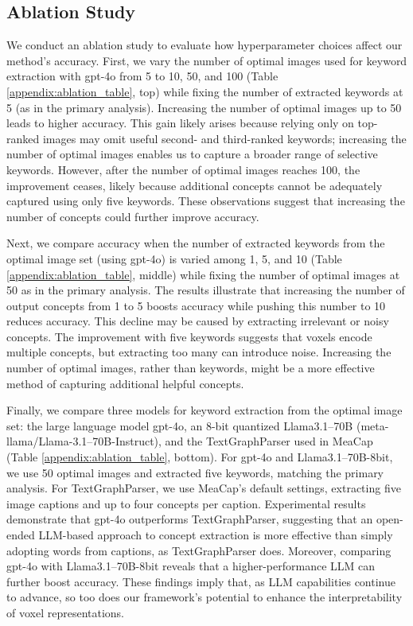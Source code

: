 \subsection{Ablation Study}
\label{appendix:ablation}
We conduct an ablation study to evaluate how hyperparameter choices affect our method’s accuracy. First, we vary the number of optimal images used for keyword extraction with gpt-4o from 5 to 10, 50, and 100 (Table \ref{appendix:ablation_table}, top) while fixing the number of extracted keywords at 5 (as in the primary analysis). Increasing the number of optimal images up to 50 leads to higher accuracy. This gain likely arises because relying only on top-ranked images may omit useful second- and third-ranked keywords; increasing the number of optimal images enables us to capture a broader range of selective keywords. However, after the number of optimal images reaches 100, the improvement ceases, likely because additional concepts cannot be adequately captured using only five keywords. These observations suggest that increasing the number of concepts could further improve accuracy.

Next, we compare accuracy when the number of extracted keywords from the optimal image set (using gpt-4o) is varied among 1, 5, and 10 (Table \ref{appendix:ablation_table}, middle) while fixing the number of optimal images at 50 as in the primary analysis. The results illustrate that increasing the number of output concepts from 1 to 5 boosts accuracy while pushing this number to 10 reduces accuracy. This decline may be caused by extracting irrelevant or noisy concepts. The improvement with five keywords suggests that voxels encode multiple concepts, but extracting too many can introduce noise. Increasing the number of optimal images, rather than keywords, might be a more effective method of capturing additional helpful concepts.

Finally, we compare three models for keyword extraction from the optimal image set: the large language model gpt-4o, an 8-bit quantized Llama3.1–70B (meta-llama/Llama-3.1–70B-Instruct), and the TextGraphParser \cite{li2023factual} used in MeaCap (Table \ref{appendix:ablation_table}, bottom). For gpt-4o and Llama3.1–70B-8bit, we use 50 optimal images and extracted five keywords, matching the primary analysis. For TextGraphParser, we use MeaCap’s default settings, extracting five image captions and up to four concepts per caption. Experimental results demonstrate that gpt-4o outperforms TextGraphParser, suggesting that an open-ended LLM-based approach to concept extraction is more effective than simply adopting words from captions, as TextGraphParser does. Moreover, comparing gpt-4o with Llama3.1–70B-8bit reveals that a higher-performance LLM can further boost accuracy. These findings imply that, as LLM capabilities continue to advance, so too does our framework’s potential to enhance the interpretability of voxel representations.


